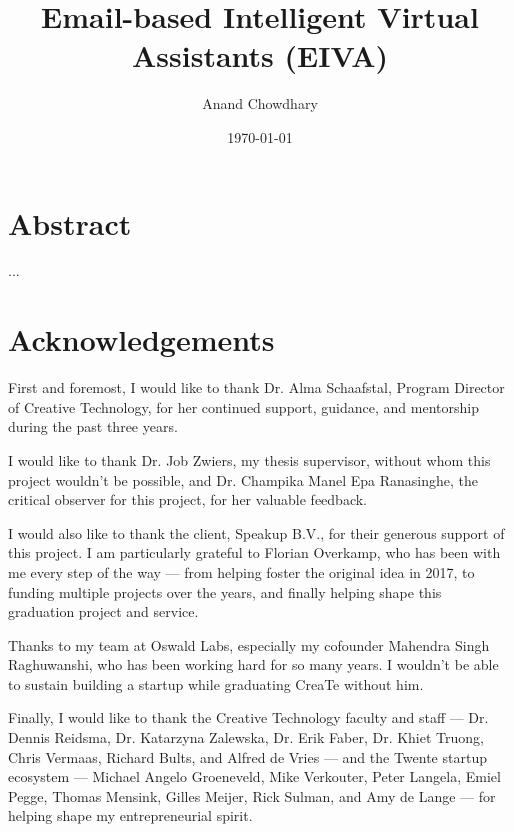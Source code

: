 \documentclass{article}
\title{Email-based Intelligent Virtual Assistants (EIVA)}
\author{Anand Chowdhary}
\date{\today}
\begin{document}

\maketitle

\newpage


\section*{Abstract}

...

\newpage

\section*{Acknowledgements}

First and foremost, I would like to thank Dr. Alma Schaafstal, Program Director of Creative Technology, for her continued support, guidance, and mentorship during the past three years.

I would like to thank Dr. Job Zwiers, my thesis supervisor, without whom this project wouldn't be possible, and Dr. Champika Manel Epa Ranasinghe, the critical observer for this project, for her valuable feedback.

I would also like to thank the client, Speakup B.V., for their generous support of this project. I am particularly grateful to Florian Overkamp, who has been with me every step of the way --- from helping foster the original idea in 2017, to funding multiple projects over the years, and finally helping shape this graduation project and service.

Thanks to my team at Oswald Labs, especially my cofounder Mahendra Singh Raghuwanshi, who has been working hard for so many years. I wouldn't be able to sustain building a startup while graduating CreaTe without him.

Finally, I would like to thank the Creative Technology faculty and staff --- Dr. Dennis Reidsma, Dr. Katarzyna Zalewska, Dr. Erik Faber, Dr. Khiet Truong, Chris Vermaas, Richard Bults, and Alfred de Vries --- and the Twente startup ecosystem --- Michael Angelo Groeneveld, Mike Verkouter, Peter Langela, Emiel Pegge, Thomas Mensink, Gilles Meijer, Rick Sulman, and Amy de Lange --- for helping shape my entrepreneurial spirit.

\newpage
\end{document}
